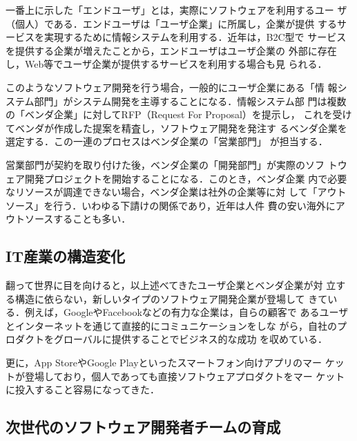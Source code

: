 \documentclass[a4j,twoside]{jarticle}
\begin{document}
\begin{multicols}{2}
    一番上に示した「エンドユーザ」とは，実際にソフトウェアを利用するユー
    ザ（個人）である．エンドユーザは「ユーザ企業」に所属し，企業が提供
    するサービスを実現するために情報システムを利用する．近年は，B2C型で
    サービスを提供する企業が増えたことから，エンドユーザはユーザ企業の
    外部に存在し，Web等でユーザ企業が提供するサービスを利用する場合も見
    られる．
    
    このようなソフトウェア開発を行う場合，一般的にユーザ企業にある「情
    報システム部門」がシステム開発を主導することになる．情報システム部
    門は複数の「ベンダ企業」に対してRFP（Request For Proposal）を提示し，
    これを受けてベンダが作成した提案を精査し，ソフトウェア開発を発注す
    るベンダ企業を選定する．この一連のプロセスはベンダ企業の「営業部門」
    が担当する．
    
    営業部門が契約を取り付けた後，ベンダ企業の「開発部門」が実際のソフ
    トウェア開発プロジェクトを開始することになる．このとき，ベンダ企業
    内で必要なリソースが調達できない場合，ベンダ企業は社外の企業等に対
    して「アウトソース」を行う．いわゆる下請けの関係であり，近年は人件
    費の安い海外にアウトソースすることも多い．
    
    \subsection{IT産業の構造変化}

    翻って世界に目を向けると，以上述べてきたユーザ企業とベンダ企業が対
    立する構造に依らない，新しいタイプのソフトウェア開発企業が登場して
    きている．例えば，GoogleやFacebookなどの有力な企業は，自らの顧客で
    あるユーザとインターネットを通じて直接的にコミュニケーションをしな
    がら，自社のプロダクトをグローバルに提供することでビジネス的な成功
    を収めている．
    
    更に，App StoreやGoogle Playといったスマートフォン向けアプリのマー
    ケットが登場しており，個人であっても直接ソフトウェアプロダクトをマー
    ケットに投入すること容易になってきた．
    
	\subsection{次世代のソフトウェア開発者チームの育成}


\end{multicols}
\end{document}
